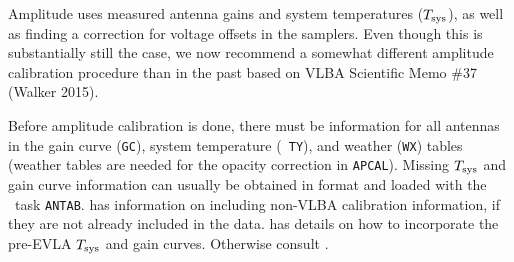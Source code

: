 Amplitude  uses measured antenna gains and system
temperatures ($T_{\rm sys}$), as well as finding a correction for
voltage offsets in the samplers.  Even though this is substantially still
the case, we now recommend a somewhat different
amplitude calibration procedure than in the past based on VLBA Scientific
Memo \#37 (Walker 2015). 

Before amplitude calibration is done, there must be information for
all antennas in the gain curve ({\tt GC}), system temperature ({\tt
  TY}), and weather ({\tt WX}) tables (weather tables are needed for
the opacity correction in {\tt APCAL}).  Missing $T_{\rm sys}$ and
gain curve information can usually be obtained in {\tt {}}
format and loaded with the \AIPS\ task {\tt ANTAB}.   has
information on including non-VLBA calibration information, if they are
not already included in the data.   has details on how
to incorporate the pre-EVLA  $T_{\rm sys}$ and gain curves.
Otherwise consult \@.

